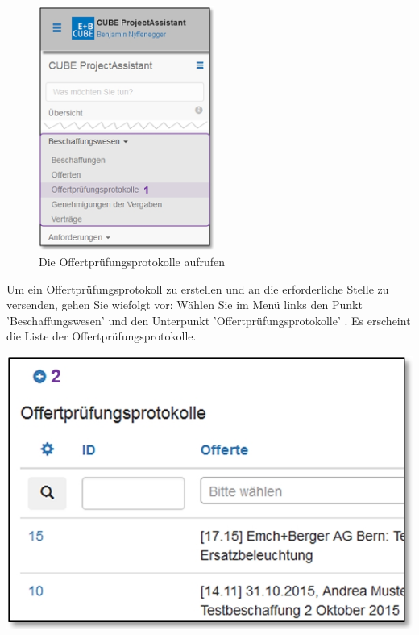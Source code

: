 \begin{figure}
  \vspace{-30pt}      %
  \begin{center}
    \includegraphics[height=80mm]{../chapters/08_Beschaffungswesen/pictures/7-1-6_Menu_Besch_Offertp.jpg}
  \end{center}
  \vspace{-20pt}
  \caption{Die Offertprüfungsprotokolle aufrufen}
  \vspace{-10pt}
\end{figure}

Um ein Offertprüfungsprotokoll zu erstellen und an die erforderliche Stelle zu versenden, gehen Sie wiefolgt vor: Wählen Sie im Menü links den Punkt 'Beschaffungswesen' und den Unterpunkt 'Offertprüfungsprotokolle' . Es erscheint die Liste der Offertprüfungsprotokolle.

\begin{center}
\hspace{-15pt}   
\includegraphics[width=.75\linewidth]{../chapters/08_Beschaffungswesen/pictures/7-1-6_NeuesOffertPruefProtokoll.jpg}
\end{center}

